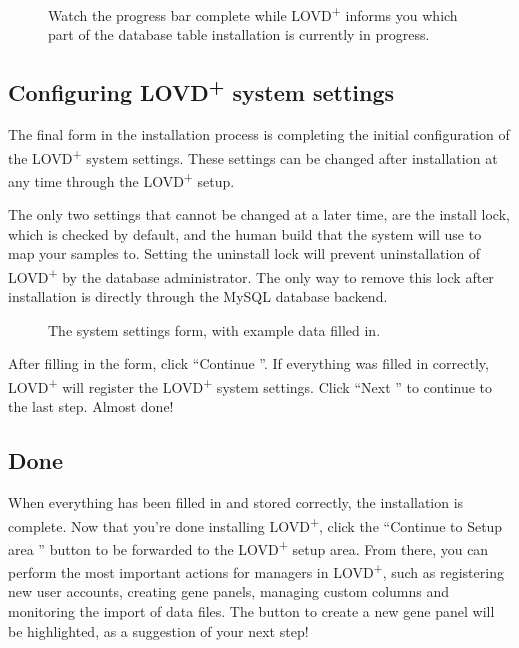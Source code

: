 \begin{figure}[ht]
  \begin{shaded}
  \caption{Watch the progress bar complete while LOVD\textsuperscript{+}
   informs you which part of the database table installation is currently in progress.}
  \end{shaded}
\end{figure}



\subsection{Configuring LOVD\textsuperscript{+} system settings}
The final form in the installation process is completing
 the initial configuration of the LOVD\textsuperscript{+} system settings.
These settings can be changed after installation at any time through the LOVD\textsuperscript{+} setup.

The only two settings that cannot be changed at a later time, are the install lock, which is checked by default,
 and the human build that the system will use to map your samples to.
Setting the uninstall lock will prevent uninstallation of LOVD\textsuperscript{+} by the database administrator.
The only way to remove this lock after installation is directly through the MySQL database backend.

\begin{figure}[ht]
  \begin{shaded}
  \caption{The system settings form, with example data filled in.}
  \end{shaded}
\end{figure}

\noindent
After filling in the form, click ``Continue \guillemotright''.
If everything was filled in correctly, LOVD\textsuperscript{+} will register
 the LOVD\textsuperscript{+} system settings.
Click ``Next \guillemotright'' to continue to the last step.
Almost done!



\subsection{Done}
When everything has been filled in and stored correctly, the installation is complete.
Now that you're done installing LOVD\textsuperscript{+}, click the ``Continue to Setup area \guillemotright'' button
 to be forwarded to the LOVD\textsuperscript{+} setup area.
From there, you can perform the most important actions for managers in LOVD\textsuperscript{+}, such as
 registering new user accounts, creating gene panels, managing custom columns and monitoring the import of data files.
The button to create a new gene panel will be highlighted, as a suggestion of your next step!










